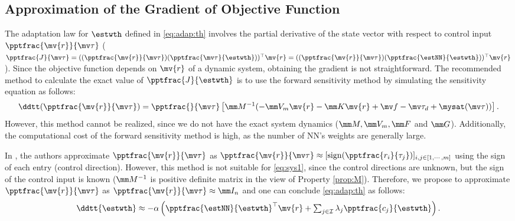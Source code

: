 \documentclass[lettersize,journal]{IEEEtran}
\newcommand*{\fe}{\mv{r}}
\begin{document}
\subsection{Approximation of the Gradient of Objective Function}

The adaptation law for $\estwth$ defined in \eqref{eq:adap:th} involves the partial derivative of the state vector with respect to control input $\pptfrac{\fe}{\mv\tau}$ (\ie 
$
    \pptfrac{J}{\mv \tau}
    =
    ((\pptfrac{\fe}{\mv\tau})(\pptfrac{\mv \tau}{\estwth}))^\top \fe
    =
    ((\pptfrac{\fe}{\mv\tau})(\pptfrac{\estNN}{\estwth}))^\top \fe
$). 
Since the objective function depends on $\fe$ of a dynamic system, obtaining the gradient is not straightforward. 
The recommended method to calculate the exact value of $\pptfrac{J}{\estwth}$ is to use the forward sensitivity method \cite{Sengupta:2014aa} by simulating the sensitivity equation as follows: 
\begin{equation}
    \ddtt (
        \pptfrac{\fe}{\mv\tau}
    )
    =
    \pptfrac{}{
        \mv\tau
    }
    \left[
        \mm M^{-1}(
            -\mm V_m \fe
            -\mm K \fe
            + \mv f
            -\mv \tau_d + \mysat(\mv\tau)
        )
    \right]
    .
\end{equation}
However, this method cannot be realized, since we do not have the exact system dynamics (\ie $\mm M,\mm V_m, \mm F$ and $ \mm G$).
Additionally, the computational cost of the forward sensitivity method is high, as the number of NN's weights are generally large.

In \cite{Douratsos:2007aa,Saerens:1991aa}, the authors approximate $\pptfrac{\fe}{\mv\tau}$ as $
    \pptfrac{\fe}{\mv\tau}
    \approx
    [
        \mathrm{sign}(\pptfrac{r_i}{\tau_j})
    ]_{i,j\in[1,\cdots,m]}
$ using the sign of each entry (\ie control direction).
However, this method is not suitable for \eqref{eq:sys1}, since the control directions are unknown, but the sign of the control input is known (\ie $\mm M^{-1}$ is positive definite matrix in the view of Property \ref{prop:M}).
Therefore, we propose to approximate $\pptfrac{\fe}{\mv\tau}$ as $\pptfrac{\fe}{\mv\tau}\approx \mm I_n$ and one can conclude \eqref{eq:adap:th} as follows:
\begin{equation}
    \ddtt{\estwth}
    \approx
    -\alpha 
    \left(
        \pptfrac{\estNN}{\estwth}^\top
        \fe
        +
        \textstyle\sum_{j\in\mathcal{I}}
        \lambda_j 
        \pptfrac{c_j}{\estwth}
    \right)
    .
    \label{eq:adap:th:approx}
\end{equation}
\end{document}
